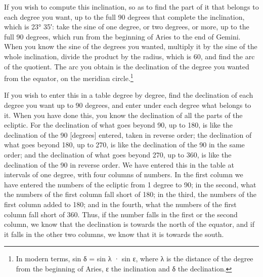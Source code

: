 \documentclass[11pt]{article}
\newcommand{\ArPage}[1]{\marginpar{\footnotesize\color{gray}Ar.\,p.\,#1}}
\begin{document}
\par If you wish to compute this inclination, so as to find the part of it that belongs to each degree you want, up to the full 90 degrees that complete the inclination, which is 23° 35′: take the sine of one degree, or two degrees, or more, up to the full 90 degrees, which run from the beginning of Aries to the end of Gemini. When you know the sine of the degrees you wanted, multiply it by the sine of the whole inclination, divide the product by the radius, which is 60, and find the arc of the quotient. The arc you obtain is the declination of the degree you wanted from the equator, on the meridian circle.\footnote{In modern terms, sin δ = sin λ · sin ε, where λ is the distance of the degree from the beginning of Aries, ε the inclination and δ the declination.}\par
\par \ArPage{19}If you wish to enter this in a table degree by degree, find the declination of each degree you want up to 90 degrees, and enter under each degree what belongs to it. When you have done this, you know the declination of all the parts of the ecliptic. For the declination of what goes beyond 90, up to 180, is like the declination of the 90 [degrees] entered, taken in reverse order; the declination of what goes beyond 180, up to 270, is like the declination of the 90 in the same order; and the declination of what goes beyond 270, up to 360, is like the declination of the 90 in reverse order. We have entered this in the table at intervals of one degree, with four columns of numbers. In the first column we have entered the numbers of the ecliptic from 1 degree to 90; in the second, what the numbers of the first column fall short of 180; in the third, the numbers of the first column added to 180; and in the fourth, what the numbers of the first column fall short of 360. Thus, if the number falls in the first or the second column, we know that the declination is towards the north of the equator, and if it falls in the other two columns, we know that it is towards the south.\par
\end{document}
